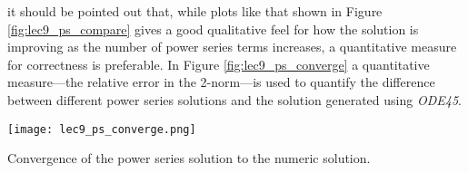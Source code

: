  it should be pointed out that, while plots like that shown in Figure \ref{fig:lec9_ps_compare} gives a good qualitative feel for how the solution is improving as the number of power series terms increases, a quantitative measure for correctness is preferable.  In Figure \ref{fig:lec9_ps_converge} a quantitative measure---the relative error in the 2-norm---is used to quantify the difference between different power series solutions and the solution generated using \emph{ODE45}. 
\begin{marginfigure}
\texttt{[image: lec9\_ps\_converge.png]}
\caption{Convergence of the power series solution to the numeric solution.}
\label{fig:lec9_ps_converge}
\end{marginfigure}   

